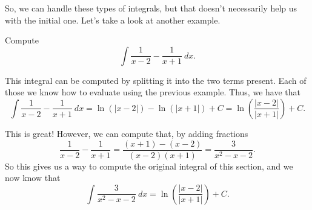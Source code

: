 So, we can handle these types of integrals, but that doesn't necessarily help us with the initial one. Let's take a look at another example.

\begin{example}
Compute 
\begin{equation*}
\int \frac{1}{x-2} - \frac{1}{x+1}\ dx.
\end{equation*}
\end{example}

\begin{exampleSol}
This integral can be computed by splitting it into the two terms present. Each of those we know how to evaluate using the previous example. Thus, we have that
\begin{equation*}
\int \frac{1}{x-2} - \frac{1}{x+1}\ dx = \ln(|x-2|) - \ln(|x+1|) + C = \ln\left(\frac{|x-2|}{|x+1|}\right) + C.
\end{equation*}
\end{exampleSol}

This is great! However, we can compute that, by adding fractions
\begin{equation*}
\frac{1}{x-2} - \frac{1}{x+1} = \frac{(x+1)-(x-2)}{(x-2)(x+1)} = \frac{3}{x^2 - x - 2}.
\end{equation*}
So this gives us a way to compute the original integral of this section, and we now know that
\begin{equation*}
\int \frac{3}{x^2 - x - 2} \ dx = \ln\left(\frac{|x-2|}{|x+1|}\right) + C.
\end{equation*}

